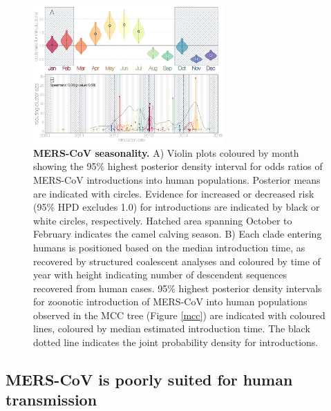 \documentclass[11pt,oneside,letterpaper]{article}
\def\lmc#1{\textcolor{green}{[#1]}}
\begin{document}
\begin{figure}[h]
\centering
	\includegraphics[width=0.65\textwidth]{figures/mers_seasonality.png}
	\caption{\textbf{MERS-CoV seasonality.}
A) Violin plots coloured by month showing the 95\% highest posterior density interval for odds ratios of MERS-CoV introductions into human populations.
Posterior means are indicated with circles.
Evidence for increased or decreased risk (95\% HPD excludes 1.0) for introductions are indicated by black or white circles, respectively.
Hatched area spanning October to February indicates the camel calving season.
B) Each clade entering humans is positioned based on the median introduction time, as recovered by structured coalescent analyses and coloured by time of year with height indicating number of descendent sequences recovered from human cases.
95\% highest posterior density intervals for zoonotic introduction of MERS-CoV into human populations observed in the MCC tree (Figure \ref{mcc}) are indicated with coloured lines, coloured by median estimated introduction time.
The black dotted line indicates the joint probability density for introductions.
	}
	\label{seasonality}
\end{figure}

%

\subsection*{MERS-CoV is poorly suited for human transmission}
\end{document}
